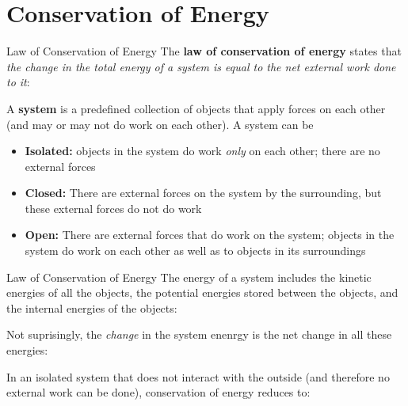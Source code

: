 \documentclass[12pt,compress,aspectratio=169]{beamer}
\begin{document}
\section{Conservation of Energy}

\begin{frame}{Law of Conservation of Energy}
  The \textbf{law of conservation of energy} states that \emph{the change in
  the total energy of a system is equal to the net external work done to it}:


  A \textbf{system} is a predefined collection of objects that apply forces
  on each other (and may or may not do work on each other). A system can be
  \begin{itemize}
  \item\textbf{Isolated:} objects in the system do work \emph{only} on
    each other; there are no external forces
  \item\textbf{Closed:} There are external forces on the system by the
    surrounding, but these external forces do not do work
  \item\textbf{Open:} There are external forces that do work on the system;
    objects in the system do work on each other as well as to objects in its
    surroundings
  \end{itemize}
\end{frame}



\begin{frame}{Law of Conservation of Energy}
  The energy of a system includes the kinetic energies of all the objects, the
  potential energies stored between the objects, and the internal energies of
  the objects:

  
  Not suprisingly, the \emph{change} in the system enenrgy is the net change
  in all these energies:
  

  \vspace{-.1in}In an isolated system that does not interact with the outside
  (and therefore no external work can be done), conservation of energy reduces
  to:

\end{frame}
\end{document}
